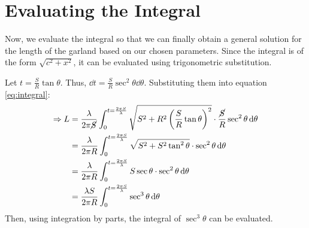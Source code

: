 \section*{Evaluating the Integral}
Now, we evaluate the integral so that we can finally obtain a general solution for the length of the garland based on our chosen parameters. Since the integral is of the form $\sqrt{c^2+x^2}$, it can be evaluated using trigonometric substitution.

\bulletarrow Let $t=\frac{S}{R}\tan{\theta}$. Thus, $\dd{t} = \frac{S}{R}\sec^2{\theta} \dd{\theta}$. Substituting them into equation \ref{eq:integral}:
\begin{align}
    \Rightarrow L & = \frac{\lambda}{2\pi \cancel{S}}\int_0^{t =\frac{2\pi S}{\lambda}} \sqrt{S^2 + R^2\left(\frac{S}{R}\tan{\theta}\right)^2} \cdot \frac{\cancel{S}}{R}\sec^2{\theta} \dd{\theta} \notag \\
                  & = \frac{\lambda}{2\pi R}\int_0^{t =\frac{2\pi S}{\lambda}} \sqrt{S^2 + S^2\tan^2{\theta}} \cdot \sec^2{\theta} \dd{\theta} \notag                                                      \\
                  & = \frac{\lambda}{2\pi R}\int_0^{t =\frac{2\pi S}{\lambda}} S\sec{\theta} \cdot \sec^2{\theta} \dd{\theta} \notag                                                                       \\
                  & = \frac{\lambda S}{2\pi R}\int_0^{t =\frac{2\pi S}{\lambda}} \sec^3{\theta} \dd{\theta}    \label{eq:subbed}
\end{align}
Then, using integration by parts, the integral of $\sec^3{\theta}$ can be evaluated.

